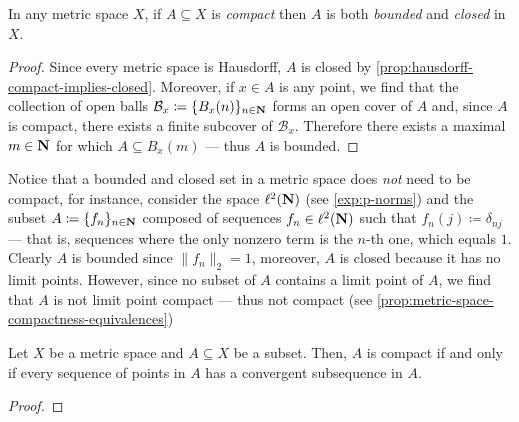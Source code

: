 \begin{corollary}
\label{cor:metric-space-compact-implies-bounded-closed}
In any metric space \(X\), if \(A \subseteq X\) is \emph{compact} then \(A\) is
both \emph{bounded} and \emph{closed} in \(X\).
\end{corollary}

\begin{proof}
Since every metric space is Hausdorff, \(A\) is closed by
\cref{prop:hausdorff-compact-implies-closed}. Moreover, if \(x \in A\) is any
point, we find that the collection of open balls \(\mathcal{B}_x \coloneq
\{B_x(n)\}_{n \in \mathbf{N}}\) forms an open cover of \(A\) and, since \(A\) is
compact, there exists a finite subcover of \(\mathcal{B}_x\). Therefore there
exists a maximal \(m \in \mathbf{N}\) for which \(A \subseteq B_x(m)\) --- thus \(A\) is
bounded.
\end{proof}

\begin{remark}
\label{rem:closed-and-bounded-not-compact}
Notice that a bounded and closed set in a metric space does \emph{not} need to
be compact, for instance, consider the space \(\ell^2(\mathbf{N})\) (see
\cref{exp:p-norms}) and the subset \(A \coloneq \{f_n\}_{n \in \mathbf{N}}\) composed of
sequences \(f_n \in \ell^2(\mathbf{N})\) such that \(f_n(j) \coloneq \delta_{n j}\) ---
that is, sequences where the only nonzero term is the \(n\)-th one, which equals
\(1\). Clearly \(A\) is bounded since \(\| f_{n} \|_2 = 1\), moreover, \(A\) is
closed because it has no limit points. However, since no subset of \(A\)
contains a limit point of \(A\), we find that \(A\) is not limit point compact
--- thus not compact (see \cref{prop:metric-space-compactness-equivalences})
\end{remark}

\begin{proposition}
\label{prop:convergent-subsequence-implies-compact}
Let \(X\) be a metric space and \(A \subseteq X\) be a subset. Then, \(A\) is
compact if and only if every sequence of points in \(A\) has a convergent
subsequence in \(A\).
\end{proposition}

\begin{proof}
\end{proof}



